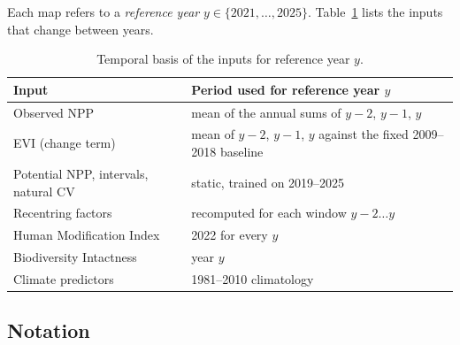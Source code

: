 \documentclass[11pt,a4paper]{article}
\begin{document}
Each map refers to a \emph{reference year} $y \in \{2021, \dots, 2025\}$. Table~\ref{tab:years}
lists the inputs that change between years.

\begin{table}[H]
\centering\small
\caption{Temporal basis of the inputs for reference year $y$.}
\label{tab:years}
\begin{tabular}{ll}
\toprule
Input & Period used for reference year $y$ \\
\midrule
Observed NPP & mean of the annual sums of $y-2$, $y-1$, $y$ \\
EVI (change term) & mean of $y-2$, $y-1$, $y$ against the fixed 2009--2018 baseline \\
Potential NPP, intervals, natural CV & static, trained on 2019--2025 \\
Recentring factors & recomputed for each window $y-2 \ldots y$ \\
Human Modification Index & 2022 for every $y$ \\
Biodiversity Intactness & year $y$ \\
Climate predictors & 1981--2010 climatology \\
\bottomrule
\end{tabular}
\end{table}

\subsection{Notation}
\end{document}
